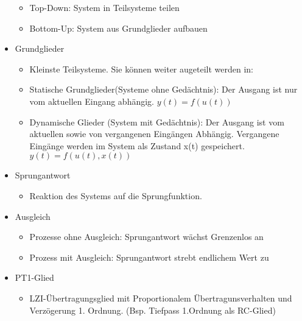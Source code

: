 \documentclass[margin=normal]{tex/hsrzf}
\begin{document}
\begin{itemize}
\begin{itemize}
          \item Top-Down: System in Teilsysteme teilen
          \item Bottom-Up: System aus Grundglieder aufbauen
        \end{itemize}
  \item Grundglieder
        \begin{itemize}
          \item Kleinste Teilsysteme. Sie können weiter augeteilt werden in:
          \item Statische Grundglieder(Systeme ohne Gedächtnis):
                Der Ausgang ist nur vom aktuellen Eingang abhängig.
                $y(t)=f(u(t))$
          \item Dynamische Glieder (System mit Gedächtnis):
                Der Ausgang ist vom aktuellen sowie von vergangenen Eingängen Abhängig.
                Vergangene Eingänge werden im System als Zustand x(t) gespeichert.
                $y(t)=f(u(t),x(t))$
        \end{itemize}
  \item Sprungantwort
        \begin{itemize}
          \item Reaktion des Systems auf die Sprungfunktion.
        \end{itemize}
  \item Ausgleich
        \begin{itemize}
          \item Prozesse ohne Ausgleich: Sprungantwort wächst Grenzenlos an
          \item Prozess mit Ausgleich: Sprungantwort strebt endlichem Wert zu
        \end{itemize}
        \item PT1-Glied
        \begin{itemize}
          \item LZI-Übertragungsglied mit Proportionalem Übertragunsverhalten
          und Verzögerung 1. Ordnung. (Bsp. Tiefpass 1.Ordnung als RC-Glied)
        \end{itemize}
\end{itemize}
\end{document}
